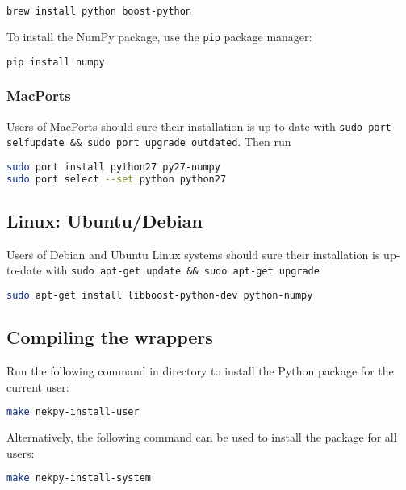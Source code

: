 \begin{lstlisting}[language=bash]
brew install python boost-python
\end{lstlisting}

To install the NumPy package, use the \texttt{pip} package manager:

\begin{lstlisting}[language=bash]
pip install numpy
\end{lstlisting}

\subsubsection{MacPorts}

Users of MacPorts should sure their installation is up-to-date with 
\texttt{sudo port selfupdate \&\& sudo port upgrade outdated}. Then run

\begin{lstlisting}[language=bash]
sudo port install python27 py27-numpy
sudo port select --set python python27
\end{lstlisting}


\subsection{Linux: Ubuntu/Debian}

Users of Debian and Ubuntu Linux systems should sure their installation is
up-to-date with \texttt{sudo apt-get update \&\& sudo apt-get upgrade}

\begin{lstlisting}[language=bash]
sudo apt-get install libboost-python-dev python-numpy
\end{lstlisting}

\subsection{Compiling the wrappers}

Run the following command in  directory to install the Python package
for the current user:

\begin{lstlisting}[language=bash]
make nekpy-install-user
\end{lstlisting}

Alternatively, the following command can be used to install the package for all users:

\begin{lstlisting}[language=bash]
make nekpy-install-system
\end{lstlisting}


